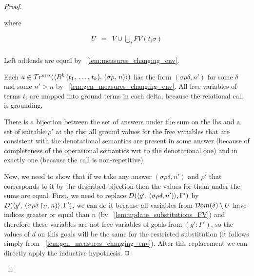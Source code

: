 \begin{proof}
\begin{enumerate}
\begin{enumerate}
    where
    
    \[ \begin{array}{lcl}
    U & = &  V \cup \bigcup_{i} FV(t_i \sigma) \\
    \end{array} \]
    
    Left addends are equal by \lemmaword~\ref{lem:measures_changing_env}.
    
    Each $a \in \mathcal{T}r^{ans}(\langle R^k\,(t_1, \, \dots, \, t_k) ,\, (\sigma\rho ,\, n) \rangle)$ has the form $(\sigma \rho \delta, n')$ for some $\delta$ and some $n' > n$ by \lemmaword~\ref{lem:gen_measures_changing_env}. All free variables of terms $t_i$ are mapped into ground terms in each delta, because the relational call is grounding.
    
    There is a bijection between the set of answers under the sum on the lhs and a set of suitable $\rho'$ at the rhs: all ground values for the free variables that are consistent with the denotational semantics are present in some answer (because of completeness of the operational semantics wrt to the denotational one) and in exactly one (because the call is non-repetitive).
    
    Now, we need to show that if we take any answer $(\sigma \rho \delta, n')$ and $\rho'$ that corresponds to it by the described bijection then the values for them under the sums are equal. First, we need to replace $D(\langle g' ,\, (\sigma \rho \delta, n') \rangle, \Gamma')$ by $D(\langle g' ,\, (\sigma \rho \delta\restriction_U, n) \rangle, \Gamma')$, we can do it because all variables from $\mathcal{D}om(\delta) \setminus U$ have indices greater or equal than $n$ (by \lemmaword~\ref{lem:update_substitutions_FV}) and therefore these variables are not free variables of goals from $(g' : \Gamma')$, so the values of $d$ on this goals will be the same for the restricted substitution (it follows simply from \lemmaword~\ref{lem:gen_measures_changing_env}). After this replacement we can directly apply the inductive hypothesis. $\qed$
	
	\end{enumerate}


\end{enumerate}
\end{proof}

